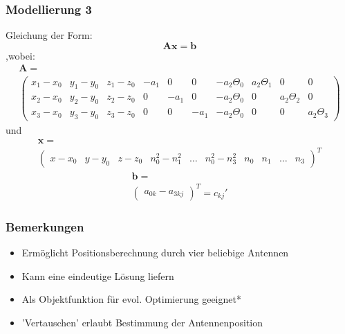 \begin{frame}
  	\frametitle{Modellierung 3}
	Gleichung der Form:
	\[\mathbf{A}\mathbf{x}=\mathbf{b}\]  
	,wobei:
	\begin{multline}
	\mathbf{A}=\\
	\left(
		\begin{array}{cccccccccc}
			x_1-x_0 & y_1-y_0 & z_1-z_0 & -a_1 & 0 & 0 & -a_2\Theta_0 & a_2\Theta_1 & 0 & 0 \\
			x_2-x_0 & y_2-y_0 & z_2-z_0 & 0 & -a_1 & 0 & -a_2\Theta_0& 0 & a_2\Theta_2 & 0 \\
			x_3-x_0 & y_3-y_0 & z_3-z_0 & 0 & 0 & -a_1 & -a_2\Theta_0& 0 & 0 & a_2\Theta_3
		\end{array}
	\right) \nonumber
	\end{multline}
	und
	\begin{multline}
	\mathbf{x}=\\
	\left(
		\begin{array}{cccccccccc}
			x-x_0 & y-y_0 & z-z_0 &	n_0^2-n_1^2	& \dots	& n_0^2-n_3^2 & n_0 & n_1 & \dots &	n_3	
		\end{array}
	\right)^T\nonumber
	\end{multline}
	\begin{multline}
		\mathbf{b}=\\
		\left(
			\begin{array}{c}
				a_{0k}-a_{3kj} 
			\end{array}
			\right)^T
			= c_{kj}'\nonumber
		\end{multline}
\end{frame}
\begin{frame}
%
  	\frametitle{Bemerkungen}
  	\begin{itemize}
		\item Ermöglicht Positionsberechnung durch vier beliebige Antennen 
		\item Kann eine eindeutige Lösung liefern
		\item Als Objektfunktion für evol. Optimierung geeignet*
		\item 'Vertauschen' erlaubt Bestimmung der Antennenposition
  	\end{itemize}
%  	
\end{frame}
